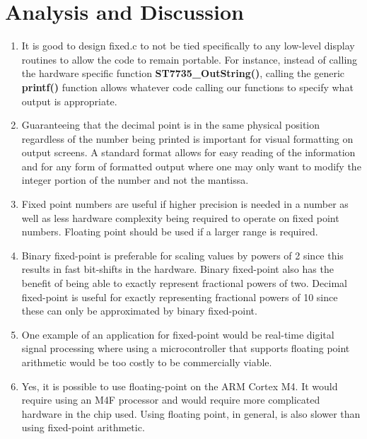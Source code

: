 \documentclass{article}
\begin{document}

\section{Analysis and Discussion}

\begin{enumerate}
\item %
It is good to design fixed.c to not be tied specifically to any low-level display routines to allow the code to remain portable. For instance, instead of calling the hardware specific function \textbf{ST7735\_OutString()}, calling the generic \textbf{printf()} function allows whatever code calling our functions to specify what output is appropriate.

\item %
Guaranteeing that the decimal point is in the same physical position regardless of the number being printed is important for visual formatting on output screens. A standard format allows for easy reading of the information and for any form of formatted output where one may only want to modify the integer portion of the number and not the mantissa.

\item %
Fixed point numbers are useful if higher precision is needed in a number as well as less hardware complexity being required to operate on fixed point numbers. Floating point should be used if a larger range is required.

\item %
Binary fixed-point is preferable for scaling values by powers of 2 since this results in fast bit-shifts in the hardware. Binary fixed-point also has the benefit of being able to exactly represent fractional powers of two. Decimal fixed-point is useful for exactly representing fractional powers of 10 since these can only be approximated by binary fixed-point.

\item %
One example of an application for fixed-point would be real-time digital signal processing where using a microcontroller that supports floating point arithmetic would be too costly to be commercially viable.

\item %
Yes, it is possible to use floating-point on the ARM Cortex M4. It would require using an M4F processor and would require more complicated hardware in the chip used. Using floating point, in general, is also slower than using fixed-point arithmetic.

\end{enumerate}
\end{document}
